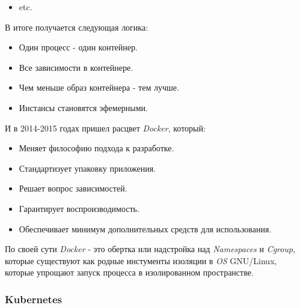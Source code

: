 \begin{itemize}
\begin{itemize}
\begin{itemize}
                    \item etc.
                \end{itemize}
        \end{itemize}
        В итоге получается следующая логика:
        \begin{itemize}
            \item Один процесс - один контейнер.
            \item Все зависимости в контейнере.
            \item Чем меньше образ контейнера - тем лучше.
            \item Инстансы становятся эфемерными.
        \end{itemize}
        И в 2014-2015 годах пришел расцвет \textit{Docker}, который:
        \begin{itemize}
            \item Меняет философию подхода к разработке.
            \item Стандартизует упаковку приложения.
            \item Решает вопрос зависимостей.
            \item Гарантирует воспроизводимость.
            \item Обеспечивает минимум дополнительных средств для использования.
        \end{itemize}
\end{itemize}
По своей сути \textit{Docker} - это обертка или надстройка над \textit{Namespaces} и \textit{Cgroup}, которые существуют как родные инстументы изоляции в \textit{OS} GNU/Linux, которые упрощают запуск процесса в изолированном пространстве.

\subsubsection{Kubernetes}

